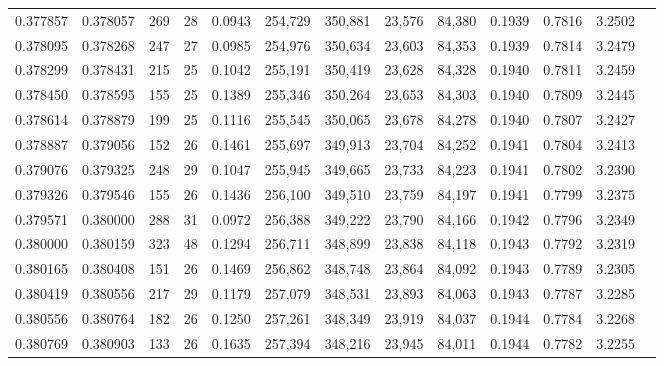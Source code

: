 \begin{tabular}{rrrrrrrrrrrrr}
0.377857 & 0.378057 &    269 &    28 &                                     0.0943 & 254,729 & 350,881 &  23,576 &  84,380 & 0.1939 & 0.7816 & 3.2502 \\
0.378095 & 0.378268 &    247 &    27 &                                     0.0985 & 254,976 & 350,634 &  23,603 &  84,353 & 0.1939 & 0.7814 & 3.2479 \\
0.378299 & 0.378431 &    215 &    25 &                                     0.1042 & 255,191 & 350,419 &  23,628 &  84,328 & 0.1940 & 0.7811 & 3.2459 \\
0.378450 & 0.378595 &    155 &    25 &                                     0.1389 & 255,346 & 350,264 &  23,653 &  84,303 & 0.1940 & 0.7809 & 3.2445 \\
0.378614 & 0.378879 &    199 &    25 &                                     0.1116 & 255,545 & 350,065 &  23,678 &  84,278 & 0.1940 & 0.7807 & 3.2427 \\
0.378887 & 0.379056 &    152 &    26 &                                     0.1461 & 255,697 & 349,913 &  23,704 &  84,252 & 0.1941 & 0.7804 & 3.2413 \\
0.379076 & 0.379325 &    248 &    29 &                                     0.1047 & 255,945 & 349,665 &  23,733 &  84,223 & 0.1941 & 0.7802 & 3.2390 \\
0.379326 & 0.379546 &    155 &    26 &                                     0.1436 & 256,100 & 349,510 &  23,759 &  84,197 & 0.1941 & 0.7799 & 3.2375 \\
0.379571 & 0.380000 &    288 &    31 &                                     0.0972 & 256,388 & 349,222 &  23,790 &  84,166 & 0.1942 & 0.7796 & 3.2349 \\
0.380000 & 0.380159 &    323 &    48 &                                     0.1294 & 256,711 & 348,899 &  23,838 &  84,118 & 0.1943 & 0.7792 & 3.2319 \\
0.380165 & 0.380408 &    151 &    26 &                                     0.1469 & 256,862 & 348,748 &  23,864 &  84,092 & 0.1943 & 0.7789 & 3.2305 \\
0.380419 & 0.380556 &    217 &    29 &                                     0.1179 & 257,079 & 348,531 &  23,893 &  84,063 & 0.1943 & 0.7787 & 3.2285 \\
0.380556 & 0.380764 &    182 &    26 &                                     0.1250 & 257,261 & 348,349 &  23,919 &  84,037 & 0.1944 & 0.7784 & 3.2268 \\
0.380769 & 0.380903 &    133 &    26 &                                     0.1635 & 257,394 & 348,216 &  23,945 &  84,011 & 0.1944 & 0.7782 & 3.2255 \\

\end{tabular}
